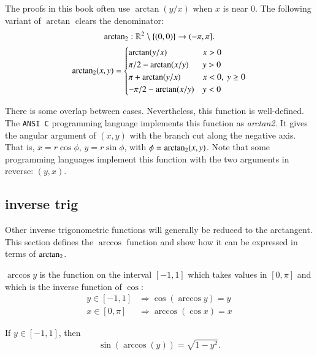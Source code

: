 The proofs in this book often use $\arctan(y/x)$ when $x$ is near $0$.
The following variant of $\arctan$ clears the denominator:
$$
{\operatorname{arctan_2}}: \mathbb{R}^2\setminus\{(0,0)\} \to (-\pi,\pi].
$$
$$
{\operatorname{arctan_2}}(x,y) = \begin{cases}
   \arctan(y/x) & x > 0\\
   \pi/2- \arctan(x/y) & y > 0 \\
   \pi + \arctan(y/x) & x< 0,\  y\ge 0\\
   -\pi/2- \arctan(x/y) & y< 0 \\
\end{cases}
$$


There is some overlap between cases. Nevertheless, 
this function is well-defined.  
The {\tt ANSI C} programming language implements this function as {\it arctan2}.  It gives the
angular argument of $(x,y)$ with the branch cut along the negative axis.
That is, $x = r\cos\phi$, $y=r\sin\phi$, with $\phi={\operatorname{arctan_2}}(x,y)$.
Note that some programming languages implement this function with the two arguments in reverse: $(y,x)$.


\subsection{inverse trig}
Other inverse trigonometric functions will generally be reduced to
the arctangent.  This section defines the $\arccos$ function and show how it can be expressed in terms of ${\operatorname{arctan_2}}$.

\begin{definition}[arccos]\label{def:arccos}
$\arccos y$ is the function on the interval $[-1,1]$ which takes
values in $[0,\pi]$ and which is the inverse function of $\cos$:
    $$\begin{array}{lll}
        y\in [-1,1] &\Rightarrow \cos(\arccos y) = y\\
        x\in[0,\pi] &\Rightarrow \arccos(\cos x) = x
    \end{array}$$
\end{definition}

\begin{lemma}\label{lemma:sin-arccos} 
If $y\in[-1,1]$, then
    $$\sin(\arccos(y)) = \sqrt{1-y^2}.$$
\end{lemma}

